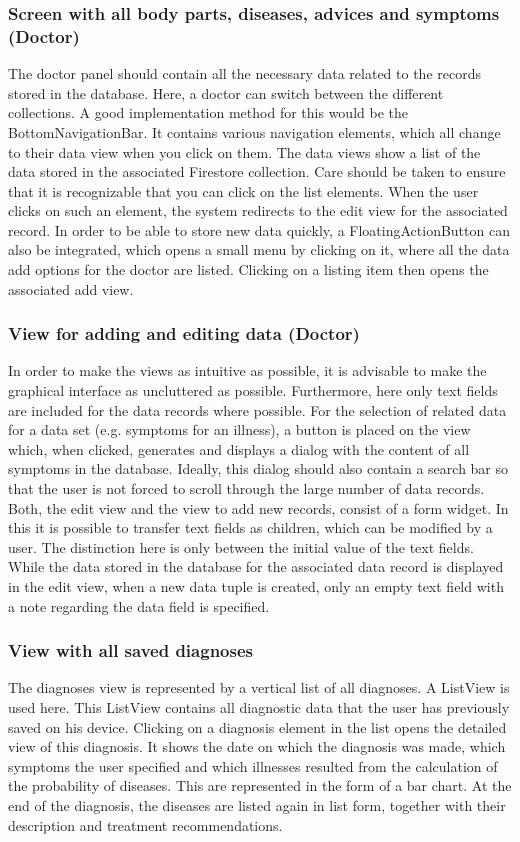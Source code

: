 \subsubsection{\textbf{Screen with all body parts, diseases, advices and symptoms (Doctor)}}
The doctor panel should contain all the necessary data related to the records stored in the database. Here, a doctor can switch between the different collections. A good implementation method for this would be the BottomNavigationBar. It contains various navigation elements, which all change to their data view when you click on them. The data views show a list of the data stored in the associated Firestore collection. Care should be taken to ensure that it is recognizable that you can click on the list elements. When the user clicks on such an element, the system redirects to the edit view for the associated record. In order to be able to store new data quickly, a FloatingActionButton can also be integrated, which opens a small menu by clicking on it, where all the data add options for the doctor are listed. Clicking on a listing item then opens the associated add view.
\subsubsection{\textbf{View for adding and editing data (Doctor)}}
In order to make the views as intuitive as possible, it is advisable to make the graphical interface as uncluttered as possible. Furthermore, here only text fields are included for the data records where possible. For the selection of related data for a data set (e.g. symptoms for an illness), a button is placed on the view which, when clicked, generates and displays a dialog with the content of all symptoms in the database. Ideally, this dialog should also contain a search bar so that the user is not forced to scroll through the large number of data records. Both, the edit view and the view to add new records, consist of a form widget. In this it is possible to transfer text fields as children, which can be modified by a user. The distinction here is only between the initial value of the text fields. While the data stored in the database for the associated data record is displayed in the edit view, when a new data tuple is created, only an empty text field with a note regarding the data field is specified.
\subsubsection{\textbf{View with all saved diagnoses}}
The diagnoses view is represented by a vertical list of all diagnoses. A ListView is used here. This ListView contains all diagnostic data that the user has previously saved on his device. Clicking on a diagnosis element in the list opens the detailed view of this diagnosis. It shows the date on which the diagnosis was made, which symptoms the user specified and which illnesses resulted from the calculation of the probability of diseases. This are represented in the form of a bar chart. At the end of the diagnosis, the diseases are listed again in list form, together with their description and treatment recommendations.

